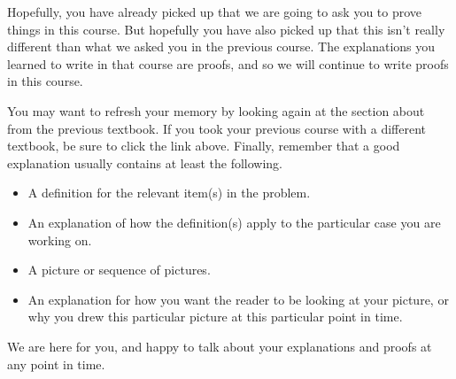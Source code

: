 \documentclass{ximera}
\begin{document}
Hopefully, you have already picked up that we are going to ask you to prove things in this course. But hopefully you have also picked up that this isn't really different than what we asked you in the previous course. The explanations you learned to write in that course are proofs, and so we will continue to write proofs in this course. 

You may want to refresh your memory by looking again at the section about  from the previous textbook. If you took your previous course with a different textbook, be sure to click the link above. Finally, remember that a good explanation usually contains at least the following.

\begin{itemize}
	\item A definition for the relevant item(s) in the problem.
	\item An explanation of how the definition(s) apply to the particular case you are working on.
	\item A picture or sequence of pictures.
	\item An explanation for how you want the reader to be looking at your picture, or why you drew this particular picture at this particular point in time.
\end{itemize}

We are here for you, and happy to talk about your explanations and proofs at any point in time.
\end{document}
